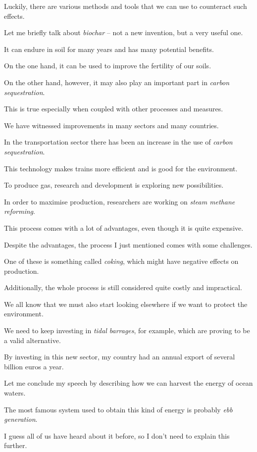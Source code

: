 \ex Luckily, there are various methods and tools that we can use to counteract such effects.

Let me briefly talk about \textit{biochar} – not a new invention, but a very useful one.

It can endure in soil for many years and has many potential benefits.

\ex On the one hand, it can be used to improve the fertility of our soils.

On the other hand, however, it may also play an important part in \textit{carbon sequestration}.

This is true especially when coupled with other processes and measures.

\ex We have witnessed improvements in many sectors and many countries.

In the transportation sector there has been an increase in the use of \textit{carbon sequestration}.

This technology makes trains more efficient and is good for the environment.

\ex To produce gas, research and development is exploring new possibilities.

In order to maximise production, researchers are working on \textit{steam methane reforming}.

This process comes with a lot of advantages, even though it is quite expensive.

\ex Despite the advantages, the process I just mentioned comes with some challenges.

One of these is something called \textit{coking}, which might have negative effects on production.

Additionally, the whole process is still considered quite costly and impractical.

\ex We all know that we must also start looking elsewhere if we want to protect the environment.

We need to keep investing in \textit{tidal barrages}, for example, which are proving to be a valid alternative.

By investing in this new sector, my country had an annual export of several billion euros a year.

\ex Let me conclude my speech by describing how we can harvest the energy of ocean waters.

The most famous system used to obtain this kind of energy is probably \textit{ebb generation}.

I guess all of us have heard about it before, so I don't need to explain this further.

